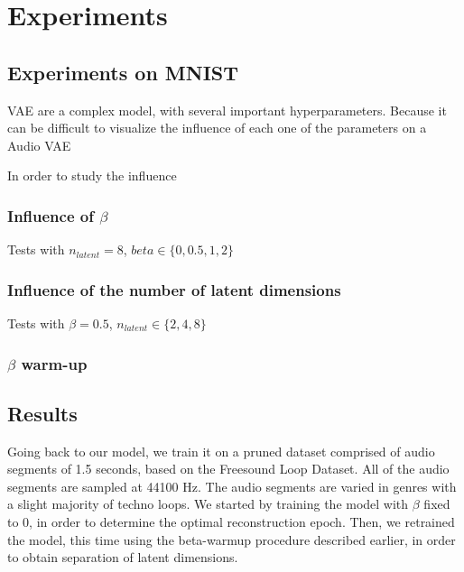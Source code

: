 \documentclass{article}
\begin{document}
\section{Experiments}
\subsection{Experiments on MNIST}

VAE are a complex model, with several important hyperparameters. Because it can be difficult to visualize the influence of each one of the parameters on a Audio VAE

In order to study the influence 

\subsubsection{Influence of $\beta$}

Tests with $n_{latent} = 8$, $beta \in \{0, 0.5, 1, 2\}$

\subsubsection{Influence of the number of latent dimensions}

Tests with $\beta=0.5$, $n_{latent} \in \{2, 4, 8\}$

\subsubsection{$\beta$ warm-up}





\subsection{Results}




Going back to our model, we train it on a pruned dataset comprised of audio segments of 1.5 seconds, based on the Freesound Loop Dataset\cite{ramires2020}. All of the audio segments are sampled at 44100 Hz. The audio segments are varied in genres with a slight majority of techno loops.
We started by training the model with $\beta$ fixed to 0, in order to determine the optimal reconstruction epoch. Then, we retrained the model, this time using the beta-warmup procedure described earlier, in order to obtain separation of latent dimensions.
\end{document}
